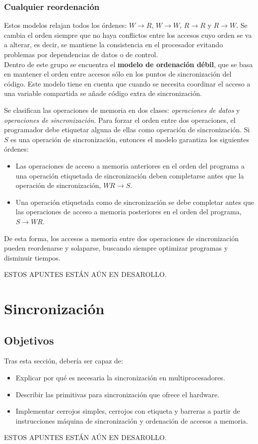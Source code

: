 \subsubsection{Cualquier reordenación}
Estos modelos relajan todos los órdenes: $W\rightarrow R$, $W\rightarrow W$, $R\rightarrow R$ y $R\rightarrow W$. Se cambia el orden siempre que no haya conflictos entre los accesos cuyo orden se va a alterar, es decir, se mantiene la consistencia en el procesador evitando problemas por dependencias de datos o de control.\\

Dentro de este grupo se encuentra el \textbf{modelo de ordenación débil}, que se basa en mantener el orden entre accesos sólo en los puntos de sincronización del código. Este modelo tiene en cuenta que cuando se necesita coordinar el acceso a una variable compartida se añade código extra de sincronización.

Se clasifican las operaciones de memoria en dos clases: \emph{operaciones de datos} y \emph{operaciones de sincronización}. Para forzar el orden entre dos operaciones, el programador debe etiquetar alguna de ellas como operación de sincronización. Si $S$ es una operación de sincronización, entonces el modelo garantiza los siguientes órdenes:
\begin{itemize}
    \item Las operaciones de acceso a memoria anteriores en el orden del programa a una operación etiquetada de sincronización deben completarse antes que la operación de sincronización, $WR\rightarrow S$.
    \item Una operación etiquetada como de sincronización se debe completar antes que las operaciones de acceso a memoria posteriores en el orden del programa, $S\rightarrow WR$.
\end{itemize}
De esta forma, los accesos a memoria entre dos operaciones de sincronización pueden reordenarse y solaparse, buscando siempre optimizar programas y disminuir tiempos.

ESTOS APUNTES ESTÁN AÚN EN DESAROLLO.


\newpage
\section{Sincronización}
\subsection{Objetivos}
Tras esta sección, debería ser capaz de:
\begin{itemize}
    \item Explicar por qué es necesaria la sincronización en multiprocesadores.
    \item Describir las primitivas para sincronización que ofrece el hardware.
    \item Implementar cerrojos simples, cerrojos con etiqueta y barreras a partir de instrucciones máquina de sincronización y ordenación de accesos a memoria.
\end{itemize}

ESTOS APUNTES ESTÁN AÚN EN DESAROLLO.
